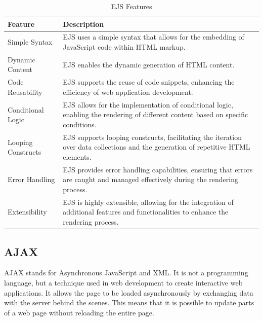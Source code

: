 \begin{table}[H]
    \centering
    \begin{tabularx}{\textwidth}{|l|X|}
        \hline
        \textbf{Feature}     & \textbf{Description}                                                                                                                              \\
        \hline
        Simple Syntax       & EJS uses a simple syntax that allows for the embedding of JavaScript code within HTML markup.                                                      \\
        \hline
        Dynamic Content     & EJS enables the dynamic generation of HTML content.                      \\
        \hline
        Code Reusability    & EJS supports the reuse of code snippets, enhancing the efficiency of web application development.                                                    \\
        \hline
        Conditional Logic   & EJS allows for the implementation of conditional logic, enabling the rendering of different content based on specific conditions.                      \\
        \hline
        Looping Constructs  & EJS supports looping constructs, facilitating the iteration over data collections and the generation of repetitive HTML elements.                      \\
        \hline
        Error Handling      & EJS provides error handling capabilities, ensuring that errors are caught and managed effectively during the rendering process.                         \\
        \hline
        Extensibility       & EJS is highly extensible, allowing for the integration of additional features and functionalities to enhance the rendering process.                      \\
        \hline
    \end{tabularx}
    \label{tab:ejs}
    \caption{EJS Features}
\end{table}

\subsection{AJAX}
AJAX stands for Asynchronous JavaScript and XML. It is not a programming language, but a technique used in web development to create interactive web applications.
It allows the page to be loaded asynchronously by exchanging data with the server behind the scenes. This means that it is possible to update parts of a web page
without reloading the entire page. 

